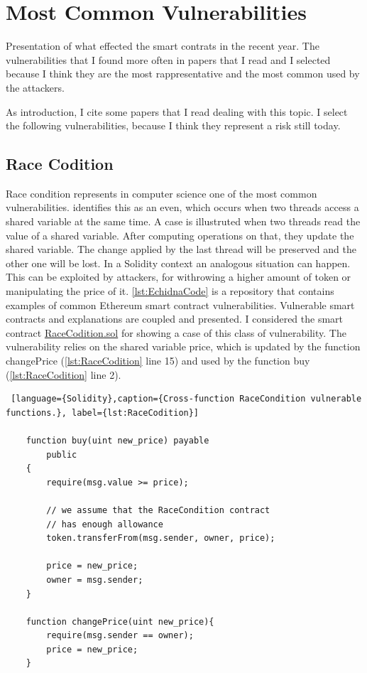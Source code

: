 \chapter{Most Common Vulnerabilities}
\label{ch:Vulnerabilities}

Presentation of what effected the smart contrats in the recent year.
The vulnerabilities that I found more often in papers that I read and I selected because I think they are the 
most rappresentative and the most common used by the attackers.

As introduction, I cite some papers that I read dealing with this topic. I select the following vulnerabilities, because I think they represent a risk still today.

\section{Race Codition}
\label{sec:Vulnerabilities:RaceCondition}
Race condition represents in computer science one of the most common vulnerabilities.
\citet{RaceConditionDef} identifies this as an even,  which occurs when two threads access a shared variable at the same time.
A case is illustruted when two threads read the value of a shared variable. After computing operations on that, they update the shared variable. The change applied by the last thread will be preserved and the other one will be lost.
In a Solidity context an analogous situation can happen. This can be exploited by attackers, for withrowing a higher amount of token or manipulating the price of it.
\autoref{lst:EchidnaCode}
 is a repository that contains examples of common Ethereum smart contract vulnerabilities.
Vulnerable smart contracts and explanations are coupled and presented. I considered the smart contract \href{https://github.com/crytic/not-so-smart-contracts/blob/master/race_condition/RaceCondition.sol}{RaceCodition.sol} for showing a case of this class of vulnerability.
The vulnerability relies on the shared variable price, which is updated by the function changePrice (\autoref{lst:RaceCodition} line 15) and used by the function buy (\autoref{lst:RaceCodition} line 2).
\begin{lstlisting} [language={Solidity},caption={Cross-function RaceCondition vulnerable functions.}, label={lst:RaceCodition}]

    function buy(uint new_price) payable
        public
    {
        require(msg.value >= price);

        // we assume that the RaceCondition contract
        // has enough allowance
        token.transferFrom(msg.sender, owner, price);

        price = new_price;
        owner = msg.sender;
    }

    function changePrice(uint new_price){
        require(msg.sender == owner);
        price = new_price; 
    }    
\end{lstlisting}

